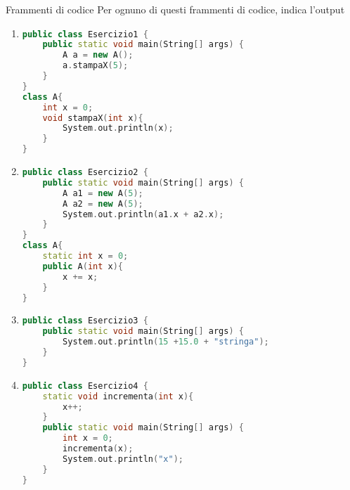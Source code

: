 \begin{esercizioL}{Frammenti di codice}
	Per ognuno di questi frammenti di codice, indica l'output
	\begin{enumerate}
		\item \quad
		      \begin{lstlisting}[language = c++, frame = none]
public class Esercizio1 {
    public static void main(String[] args) {
        A a = new A();
        a.stampaX(5);
    }
}
class A{
    int x = 0;
    void stampaX(int x){
        System.out.println(x);
    }
}
                \end{lstlisting}
		\item \quad
		      \begin{lstlisting}[language = c++, frame = none]
public class Esercizio2 {
    public static void main(String[] args) {
        A a1 = new A(5);
        A a2 = new A(5);
        System.out.println(a1.x + a2.x);
    }
}
class A{
    static int x = 0;
    public A(int x){
        x += x;
    }
}
\end{lstlisting}
		\item \quad
		      \begin{lstlisting}[language = c++, frame = none]
public class Esercizio3 {
    public static void main(String[] args) {
        System.out.println(15 +15.0 + "stringa");
    }
}
\end{lstlisting}
		\item \quad


		      \begin{lstlisting}[language = c++, frame = none]
public class Esercizio4 {
    static void incrementa(int x){
        x++;
    }
    public static void main(String[] args) {
        int x = 0;
        incrementa(x);
        System.out.println("x");
    }
}
\end{lstlisting}
	\end{enumerate}
\end{esercizioL}




